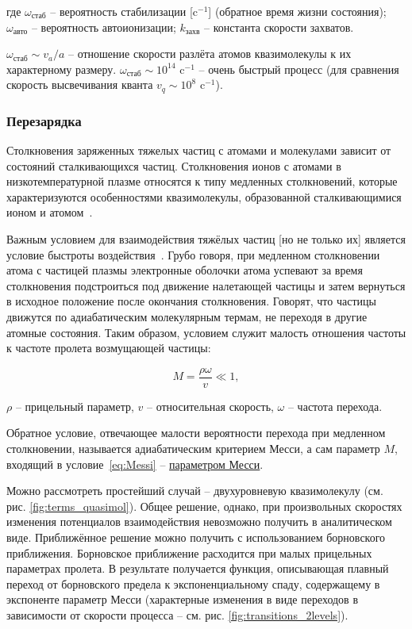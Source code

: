 \documentclass[10pt, a4paper]{article}
\begin{document}
где $\omega_{\text{стаб}}$ -- вероятность стабилизации [c$^{-1}$] (обратное время жизни состояния); $\omega_{\text{авто}}$ -- вероятность автоионизации; $k_{\text{захв}}$ -- константа скорости захватов.

$\omega_{\text{стаб}} \sim v_a/a$ -- отношение скорости разлёта атомов квазимолекулы к их характерному размеру. $\omega_{\text{стаб}} \sim 10^{14}$ c$^{-1}$ -- очень быстрый процесс (для сравнения скорость высвечивания кванта $v_{q} \sim 10^{8}$ c$^{-1}$).

\subsubsection{Перезарядка}

Столкновения заряженных тяжелых частиц с атомами и молекулами зависит от состояний сталкивающихся частиц. Столкновения ионов с атомами в низкотемпературной плазме относятся к типу медленных столкновений, которые характеризуются особенностями квазимолекулы, образованной сталкивающимися ионом и атомом~\cite{astap}.

Важным условием для взаимодействия тяжёлых частиц [но не только их] является условие быстроты воздействия~\cite{astap}. Грубо говоря, при медленном столкновении атома с частицей плазмы электронные оболочки атома успевают за время столкновения подстроиться под движение налетающей частицы и затем вернуться в исходное положение после окончания столкновения. Говорят, что частицы движутся по адиабатическим молекулярным термам, не переходя в другие атомные состояния. Таким образом, условием служит малость отношения частоты к частоте пролета возмущающей частицы: 

\begin{equation} \label{eq:Messi}
	M = \frac{\rho \omega}{v} \ll 1,
\end{equation}

$\rho$ -- прицельный параметр, $v$ -- относительная скорость, $\omega$ -- частота перехода.

Обратное условие, отвечающее малости вероятности перехода при медленном столкновении, называется адиабатическим критерием Месси, а сам параметр $M$, входящий в условие~\eqref{eq:Messi} -- \uline{параметром Месси}.

Можно рассмотреть простейший случай -- двухуровневую квазимолекулу (см. рис. \ref{fig:terms_quasimol}). Общее решение, однако, при произвольных скоростях изменения потенциалов
взаимодействия невозможно получить в аналитическом виде. Приближённое решение можно получить с использованием борновского приближения. Борновское приближение расходится при малых прицельных параметрах пролета. В результате получается
функция, описывающая плавный переход от борновского предела
к экспоненциальному спаду, содержащему в экспоненте параметр Месси (характерные изменения в виде переходов в зависимости от скорости процесса -- см. рис. \ref{fig:transitions_2levels}).
\end{document}
